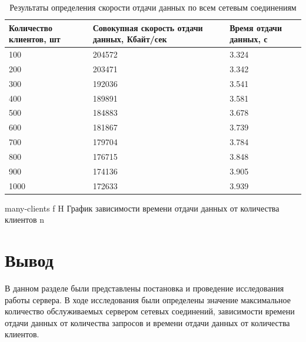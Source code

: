\begin{table}[H]
	\centering
	\caption{Результаты определения скорости отдачи данных по всем сетевым соединениям}
	\label{tbl:speed-results-2}
	\begin{tabularx}{\textwidth}{|X|X|X|}
		\hline
		\textbf{Количество клиентов, шт} & \textbf{Совокупная скорость отдачи данных, Кбайт/сек} & \textbf{Время отдачи данных, с} \\
		\hline
		100 & 204572 & 3.324 \\
		\hline
		200 & 203471 & 3.342 \\
		\hline
		300 & 192036 & 3.541 \\
		\hline 
		400 & 189891 & 3.581 \\
		\hline 
		500 & 184883 & 3.678 \\
		\hline 
		600 & 181867 & 3.739 \\
		\hline 
		700 & 179704 & 3.784 \\ 
		\hline
		800 & 176715 & 3.848 \\
		\hline 
		900 & 174136 & 3.905 \\
		\hline 
		1000 & 172633 & 3.939 \\
		\hline
	\end{tabularx}
\end{table}

{many-clients}
{f} %
{H}
{\textwidth} %
{График зависимости времени отдачи данных от количества клиентов}
{n}

\section*{Вывод}

В данном разделе были представлены постановка и проведение исследования работы сервера. В ходе исследования были определены значение максимальное количество обслуживаемых сервером сетевых соединений, зависимости времени отдачи данных от количества запросов и времени отдачи данных от количества клиентов.
